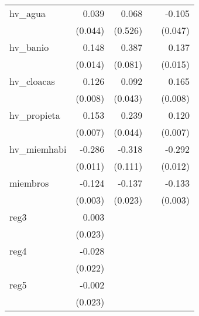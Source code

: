 {\begin{longtable}{l*{4}{D{.}{.}{-1}}}
\addlinespace
hv\_agua     &       0.039         &       0.068         &                     &      -0.105\sym{*}  \\
            &     (0.044)         &     (0.526)         &                     &     (0.047)         \\
\addlinespace
hv\_banio    &       0.148\sym{***}&       0.387\sym{***}&                     &       0.137\sym{***}\\
            &     (0.014)         &     (0.081)         &                     &     (0.015)         \\
\addlinespace
hv\_cloacas  &       0.126\sym{***}&       0.092\sym{*}  &                     &       0.165\sym{***}\\
            &     (0.008)         &     (0.043)         &                     &     (0.008)         \\
\addlinespace
hv\_propieta &       0.153\sym{***}&       0.239\sym{***}&                     &       0.120\sym{***}\\
            &     (0.007)         &     (0.044)         &                     &     (0.007)         \\
\addlinespace
hv\_miemhabi &      -0.286\sym{***}&      -0.318\sym{**} &                     &      -0.292\sym{***}\\
            &     (0.011)         &     (0.111)         &                     &     (0.012)         \\
\addlinespace
miembros    &      -0.124\sym{***}&      -0.137\sym{***}&                     &      -0.133\sym{***}\\
            &     (0.003)         &     (0.023)         &                     &     (0.003)         \\
\addlinespace
reg3        &       0.003         &                     &                     &                     \\
            &     (0.023)         &                     &                     &                     \\
\addlinespace
reg4        &      -0.028         &                     &                     &                     \\
            &     (0.022)         &                     &                     &                     \\
\addlinespace
reg5        &      -0.002         &                     &                     &                     \\
            &     (0.023)         &                     &                     &                     \\

\end{longtable}}
